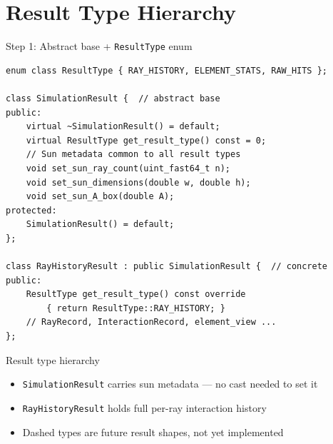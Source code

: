 \documentclass{beamer}
\begin{document}
\section{Result Type Hierarchy}

\begin{frame}[fragile]{Step 1: Abstract base + \texttt{ResultType} enum}
\begin{lstlisting}
enum class ResultType { RAY_HISTORY, ELEMENT_STATS, RAW_HITS };

class SimulationResult {  // abstract base
public:
    virtual ~SimulationResult() = default;
    virtual ResultType get_result_type() const = 0;
    // Sun metadata common to all result types
    void set_sun_ray_count(uint_fast64_t n);
    void set_sun_dimensions(double w, double h);
    void set_sun_A_box(double A);
protected:
    SimulationResult() = default;
};

class RayHistoryResult : public SimulationResult {  // concrete
public:
    ResultType get_result_type() const override
        { return ResultType::RAY_HISTORY; }
    // RayRecord, InteractionRecord, element_view ...
};
\end{lstlisting}
\end{frame}

\begin{frame}{Result type hierarchy}
\begin{center}
\end{center}
\vspace{0.4em}
\begin{itemize}
  \item \texttt{SimulationResult} carries sun metadata — no cast needed to set it
  \item \texttt{RayHistoryResult} holds full per-ray interaction history
  \item Dashed types are future result shapes, not yet implemented
\end{itemize}
\end{frame}
\end{document}
